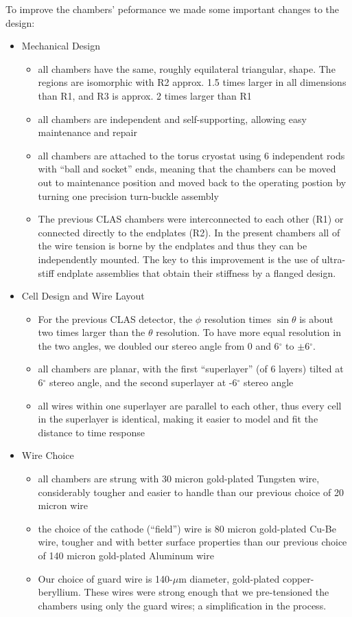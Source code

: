 To improve the chambers' peformance we made some important changes to the design:
\begin{itemize}
\item Mechanical Design
\begin{itemize}
\item all chambers have the same, roughly equilateral triangular, shape.
The regions are isomorphic with R2 approx. 1.5 times larger
in all dimensions than R1, and R3 is approx. 2 times larger than R1
\item all chambers are independent and self-supporting, allowing easy
maintenance and repair
\item all chambers are attached to the torus cryostat using 6 independent
rods with ``ball and socket'' ends, meaning that the chambers can be
moved out to maintenance position and moved back to the operating 
postion by turning one precision turn-buckle assembly
\item The previous CLAS chambers were interconnected to each other (R1) or 
connected directly to the endplates (R2).  In the present chambers all of the wire tension
is borne by the endplates and thus they can be independently mounted.
The key to this improvement is the use of  
ultra-stiff endplate assemblies that obtain their stiffness 
by a flanged design.
\end{itemize}
\item Cell Design and Wire Layout
\begin{itemize}  
\item For the previous CLAS detector, the $\phi$ resolution times $\sin \theta$ is about two 
times larger than the $\theta$ resolution.  To have more equal resolution in 
the two angles, we doubled our stereo angle from 0 and 6$^\circ$ to 
$\pm$6$^\circ$.
\item all chambers are planar, with the first ``superlayer'' (of 6 layers)
tilted at 6$^\circ$ stereo angle, and the second superlayer at -6$^\circ$ stereo
angle
\item all wires within one superlayer are parallel to each other, thus
every cell in the superlayer is identical, making it easier to model
and fit the distance to time response
\end{itemize}
\item Wire Choice
\begin{itemize}
\item all chambers are strung with 30 micron gold-plated Tungsten wire,
considerably tougher and easier to handle than our previous choice 
of 20 micron wire
\item the choice of the cathode (``field'') wire is 80 micron gold-plated
Cu-Be wire, tougher and with better surface properties than our previous
choice of 140 micron gold-plated Aluminum wire
\item  Our choice of guard wire is 140-$\mu$m diameter, gold-plated
copper-beryllium.  These wires were strong enough that we pre-tensioned 
the chambers using only the guard wires; a simplification in the process.
\end{itemize}
\end{itemize}


